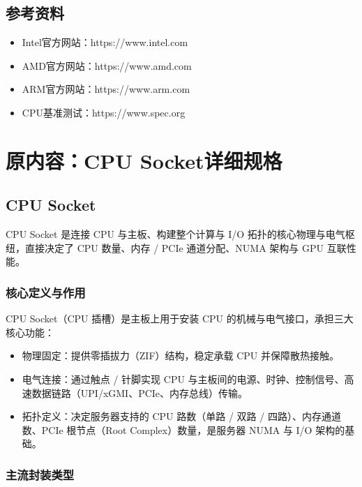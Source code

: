 \documentclass[12pt,UTF8]{ctexbook}
\begin{document}
\chapter{参考资料}

\begin{itemize}[leftmargin=2em]
    \item Intel官方网站：https://www.intel.com
    \item AMD官方网站：https://www.amd.com
    \item ARM官方网站：https://www.arm.com
    \item CPU基准测试：https://www.spec.org
\end{itemize}

\part{原内容：CPU Socket详细规格}

\chapter{CPU Socket}

CPU Socket 是连接 CPU 与主板、构建整个计算与 I/O 拓扑的核心物理与电气枢纽，直接决定了 CPU 数量、内存 / PCIe 通道分配、NUMA 架构与 GPU 互联性能。

\section{核心定义与作用}

CPU Socket（CPU 插槽）是主板上用于安装 CPU 的机械与电气接口，承担三大核心功能：

\begin{itemize}[leftmargin=2em]
  \item 物理固定：提供零插拔力（ZIF）结构，稳定承载 CPU 并保障散热接触。
  \item 电气连接：通过触点 / 针脚实现 CPU 与主板间的电源、时钟、控制信号、高速数据链路（UPI/xGMI、PCIe、内存总线）传输。
  \item 拓扑定义：决定服务器支持的 CPU 路数（单路 / 双路 / 四路）、内存通道数、PCIe 根节点（Root Complex）数量，是服务器 NUMA 与 I/O 架构的基础。
\end{itemize}

\section{主流封装类型}
\end{document}
